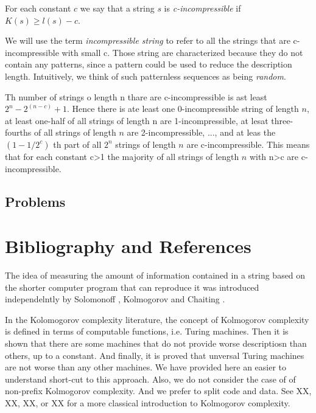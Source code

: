\begin{definition}
For each constant $c$ we say that a string $s$ is \emph{c-incompressible} if $K(s)\geq l(s)-c$.
\end{definition}

We will use the term \emph{incompressible string} to refer to all the strings that are c-incompressible with small c. Those string are characterized because they do not contain any patterns, since a pattern could be used to reduce the description length. Intuitively, we think of such patternless sequences as being \emph{random}.

Th number of strings o length n thare are c-incompressible is ast least $2^n - 2^(n-c) + 1$. Hence there is ate least one 0-incompressible string of length $n$, at least one-half of all strings of length n are 1-incompressible, at lesat three-fourths of all strings of length $n$ are 2-incompressible, ..., and at leas the $(1-1/2^c)$ th part of all $2^n$ strings of length $n$ are c-incompressible. This means that for each constant c>1 the majority of all strings of length $n$ with n>c are c-incompressible.

\subsection*{Problems}

%
%

\section*{Bibliography and References}

The idea of measuring the amount of information contained in a string based on the shorter computer program that can reproduce it was introduced independelntly by Solomonoff \cite{solomonoff1964formal}, Kolmogorov \cite{kolmogorov1965three} and Chaiting \cite{chaitin1969simplicity}.

In the Kolomogorov complexity literature, the concept of Kolmogorov complexity is defined in terms of computable functions, i.e. Turing machines. Then it is shown that there are some machines that do not provide worse descriptiosn than others, up to a constant. And finally, it is proved that unversal Turing machines are not worse than any other machines. We have provided here an easier to understand short-cut to this approach. Also, we do not consider the case of of non-prefix Kolmogorov complexity. And we prefer to split code and data. See XX, XX, XX, or XX for a more classical introduction to Kolmogorov complexity.

